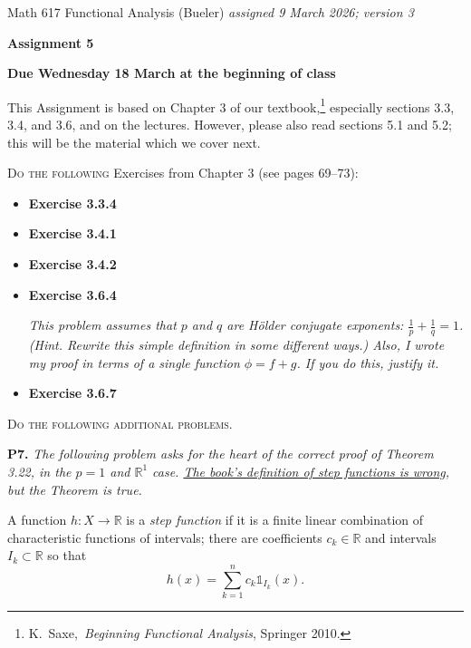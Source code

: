 \documentclass[12pt]{amsart}
\newcommand{\RR}{\mathbb{R}}
\newcommand{\one}{\mathds{1}}
\newcommand{\prob}[1]{\bigskip\noindent\textbf{#1.}\quad }
\begin{document}
\scriptsize \noindent Math 617 Functional Analysis (Bueler) \hfill \emph{assigned 9 March 2026; {\color{red} version 3}}
\normalsize\medskip

\Large\centerline{\textbf{Assignment 5}}
\large
\medskip

\centerline{\textbf{Due Wednesday 18 March at the beginning of class}}
\medskip
\normalsize

\thispagestyle{empty}

\bigskip
\noindent This Assignment is based on Chapter 3 of our textbook,\footnote{K.~Saxe,~\emph{Beginning Functional Analysis}, Springer 2010.} especially sections 3.3, 3.4, and 3.6, and on the lectures.  However, please also read sections 5.1 and 5.2; this will be the material which we cover next.


\newcommand{\augment}[1]{\quad\,\strut \begin{minipage}[t]{0.7\textwidth} \emph{#1}\end{minipage}}

\newcommand{\augpart}[1]{\emph{\textbf{(#1)}}}

\bigskip
\noindent \textsc{Do the following} Exercises from Chapter 3 (see pages 69--73):

\begin{itemize}
\item \textbf{Exercise 3.3.4}
\item \textbf{Exercise 3.4.1}
\item \textbf{Exercise 3.4.2}
\item \textbf{Exercise 3.6.4} \augment{{\color{red} This problem assumes that $p$ and $q$ are H\"older conjugate exponents: $\frac{1}{p} + \frac{1}{q}=1$.  (Hint.  Rewrite this simple definition in some different ways.)  Also, I wrote my proof in terms of a single function $\phi=f+g$.  If you do this, justify it.}}
\item \textbf{Exercise 3.6.7}
\end{itemize}

\medskip
\noindent \textsc{Do the following additional problems.}

\prob{P7}  \emph{The following problem asks for the heart of the correct proof of Theorem 3.22, in the $p=1$ and $\RR^1$ case.  \href{https://bueler.github.io/fa/corrections.html}{The book's definition of step functions is wrong}, but the Theorem is true.}

\medskip \noindent A function $h:X \to \RR$ is a \emph{step function} if it is a finite linear combination of characteristic functions of intervals; there are coefficients $c_k \in \RR$ and intervals $I_k\subset \RR$ so that
   $$h(x) = \sum_{k=1}^n c_k \one_{I_k}(x).$$
\end{document}
